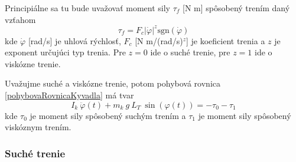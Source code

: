 \documentclass[a4paper, 10pt, ]{article}
\begin{document}
Principiálne sa tu bude uvažovať moment sily $\tau_f$ [N m] spôsobený trením daný vzťahom
\begin{equation}
    \tau_f = F_{c} \left| \dot \varphi \right|^{z} \text{sgn}(\dot \varphi) 
\end{equation}
kde $\dot \varphi$ [rad/s] je uhlová rýchlosť, $F_{c}$ [N m/(rad/s)$^z$] je koeficient trenia a $z$ je exponent určujúci typ trenia. Pre $z = 0$ ide o suché trenie, pre $z = 1$ ide o viskózne trenie.

Uvažujme suché a viskózne trenie, potom pohybová rovnica \eqref{pohybovaRovnicaKyvadla} má tvar
\begin{equation} \label{pohybovaRovnicaKyvadlaTrenie}
    I_k \  \ddot\varphi(t) + m_k \  g \   L_T \  \sin(\varphi(t)) = - \tau_0 - \tau_1
\end{equation}
kde $\tau_0$ je moment sily spôsobený suchým trením a $\tau_1$ je moment sily spôsobený viskóznym trením.


\subsubsection{Suché trenie}
\end{document}
